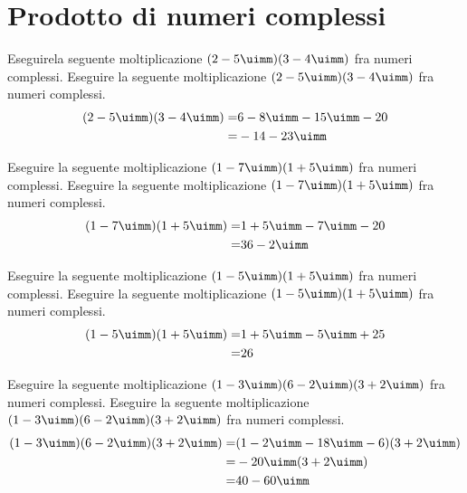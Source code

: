  \section{Prodotto di numeri complessi}
 \begin{exercise}
Eseguirela seguente moltiplicazione $(2-5\uimm)(3-4\uimm)$ fra numeri complessi.
\tcblower
Eseguire la seguente moltiplicazione $(2-5\uimm)(3-4\uimm)$ fra numeri complessi.
\begin{align*}
(2-5\uimm)(3-4\uimm)=&6-8\uimm-15\uimm-20\\
=&-14-23\uimm
\end{align*}
 \end{exercise}
 \begin{exercise}
	Eseguire la seguente moltiplicazione $(1-7\uimm)(1+5\uimm)$ fra numeri complessi.
	\tcblower
	Eseguire la seguente moltiplicazione $(1-7\uimm)(1+5\uimm)$ fra numeri complessi.
	\begin{align*}
	(1-7\uimm)(1+5\uimm)=&1+5\uimm-7\uimm-20\\
	=&36-2\uimm
	\end{align*}
\end{exercise}
 \begin{exercise}
	Eseguire la seguente moltiplicazione $(1-5\uimm)(1+5\uimm) $ fra numeri complessi.
	\tcblower
	Eseguire la seguente moltiplicazione $(1-5\uimm)(1+5\uimm)$ fra numeri complessi.
	\begin{align*}
	(1-5\uimm)(1+5\uimm)=&1+5\uimm-5\uimm+25\\
	=&26
	\end{align*}
\end{exercise}
\begin{exercise}
	Eseguire la seguente moltiplicazione $(1-3\uimm)(6-2\uimm)(3+2\uimm)$ fra numeri complessi.
	\tcblower
	Eseguire la seguente moltiplicazione $(1-3\uimm)(6-2\uimm)(3+2\uimm)$ fra numeri complessi.
	\begin{align*}
	(1-3\uimm)(6-2\uimm)(3+2\uimm)=&(1-2\uimm-18\uimm-6)(3+2\uimm)\\
	=&-20\uimm(3+2\uimm)\\
	=&40-60\uimm\\
	\end{align*}
\end{exercise}

 